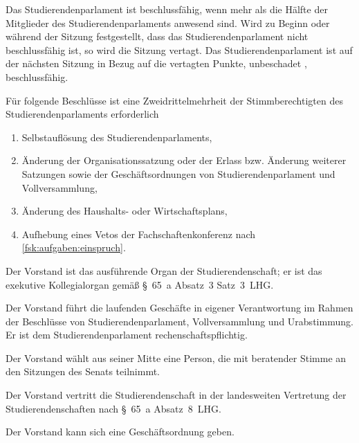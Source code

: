 \begin{jurdoc}
\label{stupa:beschluesse}

Das Studierendenparlament ist beschlussfähig, wenn mehr als die Hälfte der Mitglieder des Studierendenparlaments anwesend sind. Wird zu Beginn oder während der Sitzung festgestellt, dass das Studierendenparlament nicht beschlussfähig ist, so wird die Sitzung vertagt. Das Studierendenparlament ist auf der nächsten Sitzung in Bezug auf die vertagten Punkte, unbeschadet , beschlussfähig.

Für folgende Beschlüsse ist eine Zweidrittelmehrheit der Stimmberechtigten des Studierendenparlaments erforderlich \label{stupa:beschluesse:zweidrittel}
\begin{enumerate}
  \item Selbstauflösung des Studierendenparlaments,
  \item Änderung der Organisationssatzung oder der Erlass bzw. Änderung weiterer Satzungen sowie der Ge\-schäfts\-ord\-nungen von Studierendenparlament und Vollversammlung,
  \item Änderung des Haushalts- oder Wirtschaftsplans,
  \item Aufhebung eines Vetos der Fachschaftenkonferenz nach \ref{fsk:aufgaben:einspruch}.
\end{enumerate}


%
%



Der Vorstand ist das ausführende Organ der Studierendenschaft; er ist das exekutive Kollegialorgan gemäß §~65~a Absatz~3 Satz~3~LHG.

Der Vorstand führt die laufenden Geschäfte in eigener Verantwortung im Rahmen der Beschlüsse von Studierendenparlament, Vollversammlung und Urabstimmung. Er ist dem Studierendenparlament rechenschaftspflichtig.

Der Vorstand wählt aus seiner Mitte eine Person, die mit beratender Stimme an den Sitzungen des Senats teilnimmt.

Der Vorstand vertritt die Studierendenschaft in der landesweiten Vertretung der Studierendenschaften nach §~65~a Absatz~8~LHG.

Der Vorstand kann sich eine Geschäftsordnung geben.


 \label{vorstand:zusammensetzung}


\end{jurdoc}

